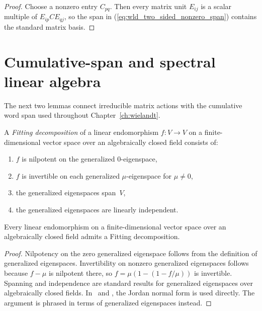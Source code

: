 \begin{proof}\leanok
    Choose a nonzero entry $C_{pq}$. Then every matrix unit $E_{ij}$
    is a scalar multiple of $E_{ip}CE_{qj}$, so the span in
    (\ref{eq:wld_two_sided_nonzero_span}) contains the standard matrix basis.
\end{proof}

\section{Cumulative-span and spectral linear algebra}
\label{sec:app_wielandt_cumulative_support}

The next two lemmas connect irreducible matrix actions with the cumulative word
span used throughout Chapter~\ref{ch:wielandt}.

\begin{definition}\label{def:fitting_decomp}
    \leanok
    A \emph{Fitting decomposition} of a linear endomorphism
    $f:V\to V$ on a finite-dimensional vector space over an
    algebraically closed field consists of:
    \begin{enumerate}
        \item $f$ is nilpotent on the generalized $0$-eigenspace,
        \item $f$ is invertible on each generalized $\mu$-eigenspace
              for $\mu\neq0$,
        \item the generalized eigenspaces span~$V$,
        \item the generalized eigenspaces are linearly independent.
    \end{enumerate}
\end{definition}

\begin{theorem}\label{thm:fitting_decomp}
    \leanok
    Every linear endomorphism on a finite-dimensional vector space
    over an algebraically closed field admits a Fitting decomposition.
\end{theorem}

\begin{proof}
    \leanok
    Nilpotency on the zero generalized eigenspace follows from
    the definition of generalized eigenspaces.
    Invertibility on nonzero generalized eigenspaces follows
    because $f-\mu$ is nilpotent there, so
    $f=\mu(1-(1-f/\mu))$ is invertible.
    Spanning and independence are standard results for
    generalized eigenspaces over algebraically closed fields.
    In~\cite{Sanz2010Quantum} and \cite[Lemma~6.3(b)]{Wolf2012Quantum},
    the Jordan normal form is used directly.
    The argument is phrased in terms of generalized eigenspaces instead.
\end{proof}

